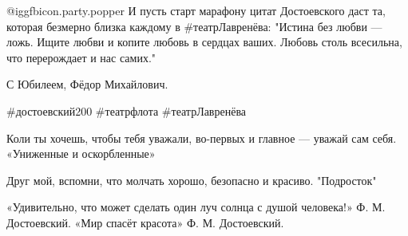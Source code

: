  @igg{fbicon.party.popper}  И пусть старт марафону цитат Достоевского даст та,
 которая безмерно близка каждому в \#театрЛавренёва: "Истина без любви — ложь.
 Ищите любви и копите любовь в сердцах ваших. Любовь столь всесильна, что
 перерождает и нас самих."

С Юбилеем, Фёдор Михайлович.

\#достоевский200 \#театрфлота \#театрЛавренёва

\begin{itemize} %
Коли ты хочешь, чтобы тебя уважали, во-первых и главное — уважай сам себя. «Униженные и оскорбленные»

Друг мой, вспомни, что молчать хорошо, безопасно и красиво. "Подросток"


«Удивительно, что может сделать один луч солнца с душой человека!» Ф. М. Достоевский.
«Мир спасёт красота» Ф. М. Достоевский.
\end{itemize} %
